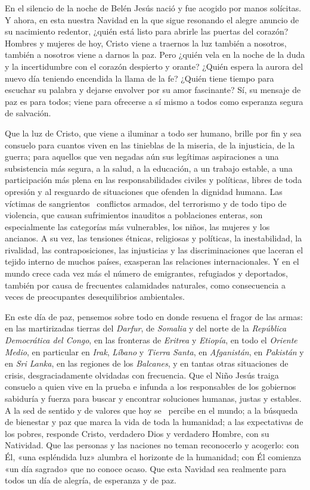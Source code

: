 En el silencio de la noche de Belén Jesús nació y fue acogido por manos
solícitas. Y ahora, en esta nuestra Navidad en la que sigue resonando el
alegre anuncio de su nacimiento redentor, ¿quién está listo para abrirle
las puertas del corazón? Hombres y mujeres de hoy, Cristo viene a
traernos la luz también a nosotros, también a nosotros viene a darnos la
paz. Pero ¿quién vela en la noche de la duda y la incertidumbre con el
corazón despierto y orante? ¿Quién espera la aurora del nuevo día
teniendo encendida la llama de la fe? ¿Quién tiene tiempo para escuchar
su palabra y dejarse envolver por su amor fascinante? Sí, su mensaje de
paz es para todos; viene para ofrecerse a sí mismo a todos como
esperanza segura de salvación.

Que la luz de Cristo, que viene a iluminar a todo ser humano, brille por
fin y sea consuelo para cuantos viven en las tinieblas de la miseria, de
la injusticia, de la guerra; para aquellos que ven negadas aún sus
legítimas aspiraciones a una subsistencia más segura, a la salud, a la
educación, a un trabajo estable, a una participación más plena en las
responsabilidades civiles y políticas, libres de toda opresión y al
resguardo de situaciones que ofenden la dignidad humana. Las víctimas de
sangrientos~ conflictos armados, del terrorismo y de todo tipo de
violencia, que causan sufrimientos inauditos a poblaciones enteras, son
especialmente las categorías más vulnerables, los niños, las mujeres y
los ancianos. A su vez, las tensiones étnicas, religiosas y políticas,
la inestabilidad, la rivalidad, las contraposiciones, las injusticias y
las discriminaciones que laceran el tejido interno de muchos países,
exasperan las relaciones internacionales. Y en el mundo crece cada vez
más el número de emigrantes, refugiados y deportados, también por causa
de frecuentes calamidades naturales, como consecuencia a veces de
preocupantes desequilibrios ambientales.

En este día de paz, pensemos sobre todo en donde resuena el fragor de
las armas: en las martirizadas tierras del \emph{Darfur}, de
\emph{Somalia} y del norte de la \emph{República Democrática del Congo},
en las fronteras de \emph{Eritrea} y \emph{Etiopía}, en todo el
\emph{Oriente Medio}, en particular en \emph{Irak}, \emph{Líbano} y
\emph{Tierra Santa}, en \emph{Afganistán}, en \emph{Pakistán} y en
\emph{Sri Lanka}, en las regiones de los \emph{Balcanes}, y en tantas
otras situaciones de crisis, desgraciadamente olvidadas con frecuencia.
Que el Niño Jesús traiga consuelo a quien vive en la prueba e infunda a
los responsables de los gobiernos sabiduría y fuerza para buscar y
encontrar soluciones humanas, justas y estables. A la sed de sentido y
de valores que hoy se ~percibe en el mundo; a la búsqueda de bienestar y
paz que marca la vida de toda la humanidad; a las expectativas de los
pobres, responde Cristo, verdadero Dios y verdadero Hombre, con su
Natividad. Que las personas y las naciones no teman reconocerlo y
acogerlo: con Él, «una espléndida luz» alumbra el horizonte de la
humanidad; con Él comienza «un día sagrado» que no conoce ocaso. Que
esta Navidad sea realmente para todos un día de alegría, de esperanza y
de paz.

